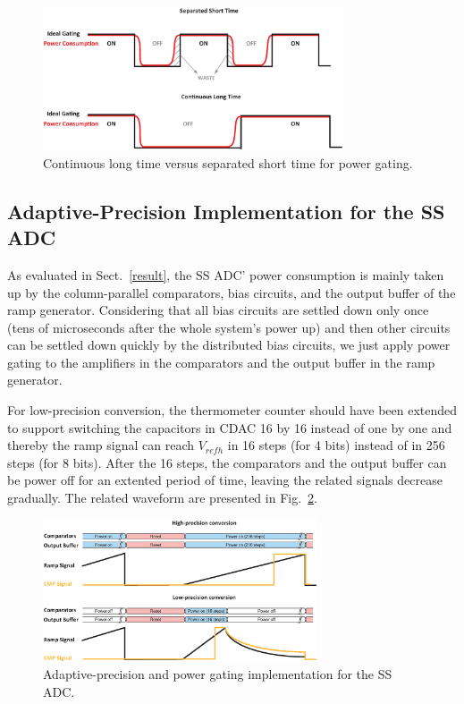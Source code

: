 \begin{figure}[htbp]
	\centerline{\includegraphics[width=3.5in]{./Figures/TIME.eps}}
	\caption{Continuous long time versus separated short time for power gating.}
	\label{TIME}
\end{figure}  

\subsection{Adaptive-Precision Implementation for the SS ADC}

As evaluated in Sect.~\ref{result}, the SS ADC’ power consumption is mainly taken up by the column-parallel comparators, bias circuits, and the output buffer of the ramp generator. 
Considering that all bias circuits are settled down only once (tens of microseconds after the whole system's power up) and then other circuits can be settled down quickly by the distributed 
bias circuits, we just apply power gating to the amplifiers in the comparators and the output buffer in the ramp generator.

For low-precision conversion, the thermometer counter should have been extended to support switching the capacitors in CDAC 16 by 16 instead of one by one and thereby the ramp signal can reach $V_{refh}$ in 16 steps (for 4 bits) instead of in 256 steps (for 8 bits). 
After the 16 steps, the comparators and the output buffer can be power off for an extented period of time, leaving the related signals decrease gradually.
The related waveform are presented in Fig.~\ref{SS_pg}. 

\begin{figure}[htbp]
	\centerline{\includegraphics[width=3.2in]{./Figures/SS_pg.eps}}
	\caption{Adaptive-precision and power gating implementation for the SS ADC.}
	\label{SS_pg}
\end{figure} 

